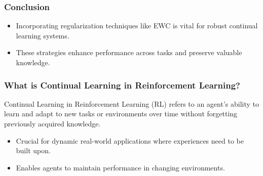 \documentclass[aspectratio=169]{beamer}
\begin{document}
\begin{frame}[fragile]
    \frametitle{Conclusion}
    \begin{itemize}
        \item Incorporating regularization techniques like EWC is vital for robust continual learning systems.
        \item These strategies enhance performance across tasks and preserve valuable knowledge.
    \end{itemize}
\end{frame}

\begin{frame}[fragile]
    \frametitle{What is Continual Learning in Reinforcement Learning?}
    Continual Learning in Reinforcement Learning (RL) refers to an agent's ability to learn and adapt to new tasks or environments over time without forgetting previously acquired knowledge. 

    \begin{itemize}
        \item Crucial for dynamic real-world applications where experiences need to be built upon.
        \item Enables agents to maintain performance in changing environments.
    \end{itemize}
\end{frame}
\end{document}
